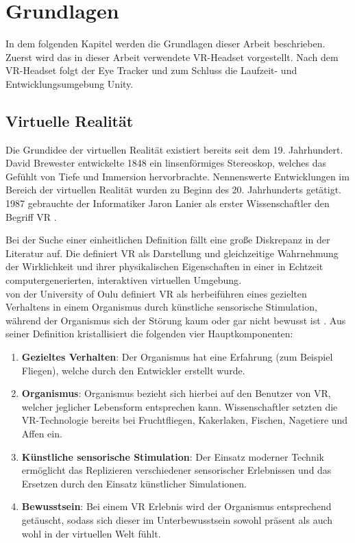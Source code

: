 
\chapter{Grundlagen}
In dem folgenden Kapitel werden die Grundlagen dieser Arbeit beschrieben. Zuerst wird das in dieser Arbeit verwendete \acs{VR}-Headset vorgestellt. Nach dem \acs{VR}-Headset folgt der Eye Tracker und zum Schluss die Laufzeit- und Entwicklungsumgebung Unity.

\section{Virtuelle Realität}
Die Grundidee der virtuellen Realität existiert bereits seit dem 19. Jahrhundert. David Brewester entwickelte 1848 ein linsenförmiges Stereoskop, welches das Gefühlt von Tiefe und Immersion hervorbrachte. Nennenswerte Entwicklungen im Bereich der virtuellen Realität wurden zu Beginn des 20. Jahrhunderts getätigt. \cite[S. 1f]{Singh.2017} 1987 gebrauchte der Informatiker Jaron Lanier als erster Wissenschaftler den Begriff \ac{VR} \cite{Doerner2019}. 

Bei der Suche einer einheitlichen Definition fällt eine große Diskrepanz in der Literatur auf. Die \citeauthor{BundeszentralefurpolitischeBildung.2018} definiert \ac{VR} als \glqq Darstellung und gleichzeitige Wahrnehmung der Wirklichkeit und ihrer physikalischen Eigenschaften in einer in Echtzeit computergenerierten, interaktiven virtuellen Umgebung\grqq  \cite{BundeszentralefurpolitischeBildung.2018}. \\
\citeauthor{LaValle.2019} von der University of Oulu definiert \ac{VR} als herbeiführen eines gezielten Verhaltens in einem Organismus durch künstliche sensorische Stimulation, während der Organismus sich der Störung kaum oder gar nicht bewusst ist \cite[S. 1]{LaValle.2019}. Aus seiner Definition kristallisiert \citeauthor{LaValle.2019} die folgenden vier Hauptkomponenten:\cite[S. 1,3]{LaValle.2019}
\begin{enumerate}
	\item \textbf{Gezieltes Verhalten}: Der Organismus hat eine Erfahrung (zum Beispiel Fliegen), welche durch den Entwickler erstellt wurde. 
	\item \textbf{Organismus}: Organismus bezieht sich hierbei auf den Benutzer von \ac{VR}, welcher jeglicher Lebensform entsprechen kann. Wissenschaftler setzten die \ac{VR}-Technologie bereits bei Fruchtfliegen, Kakerlaken, Fischen, Nagetiere und Affen ein. 
	\item \textbf{Künstliche sensorische Stimulation}: Der Einsatz moderner Technik ermöglicht das Replizieren verschiedener sensorischer Erlebnissen und das Ersetzen durch den Einsatz künstlicher Simulationen. 
	\item \textbf{Bewusstsein}: Bei einem \acl{VR} Erlebnis wird der Organismus entsprechend getäuscht, sodass sich dieser im Unterbewusstsein sowohl präsent als auch wohl in der virtuellen Welt fühlt.
\end{enumerate}

